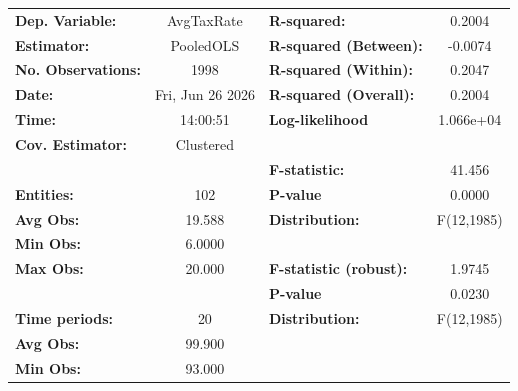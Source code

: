 \begin{center}
\begin{tabular}{lclc}
\toprule
\textbf{Dep. Variable:}                            &     AvgTaxRate     & \textbf{  R-squared:         }   &      0.2004      \\
\textbf{Estimator:}                                &     PooledOLS      & \textbf{  R-squared (Between):}  &     -0.0074      \\
\textbf{No. Observations:}                         &        1998        & \textbf{  R-squared (Within):}   &      0.2047      \\
\textbf{Date:}                                     &  Fri, Jun 26 2026  & \textbf{  R-squared (Overall):}  &      0.2004      \\
\textbf{Time:}                                     &      14:00:51      & \textbf{  Log-likelihood     }   &    1.066e+04     \\
\textbf{Cov. Estimator:}                           &     Clustered      & \textbf{                     }   &                  \\
\textbf{}                                          &                    & \textbf{  F-statistic:       }   &      41.456      \\
\textbf{Entities:}                                 &        102         & \textbf{  P-value            }   &      0.0000      \\
\textbf{Avg Obs:}                                  &       19.588       & \textbf{  Distribution:      }   &    F(12,1985)    \\
\textbf{Min Obs:}                                  &       6.0000       & \textbf{                     }   &                  \\
\textbf{Max Obs:}                                  &       20.000       & \textbf{  F-statistic (robust):} &      1.9745      \\
\textbf{}                                          &                    & \textbf{  P-value            }   &      0.0230      \\
\textbf{Time periods:}                             &         20         & \textbf{  Distribution:      }   &    F(12,1985)    \\
\textbf{Avg Obs:}                                  &       99.900       & \textbf{                     }   &                  \\
\textbf{Min Obs:}                                  &       93.000       & \textbf{                     }   &                  \\

\end{tabular}
\end{center}

